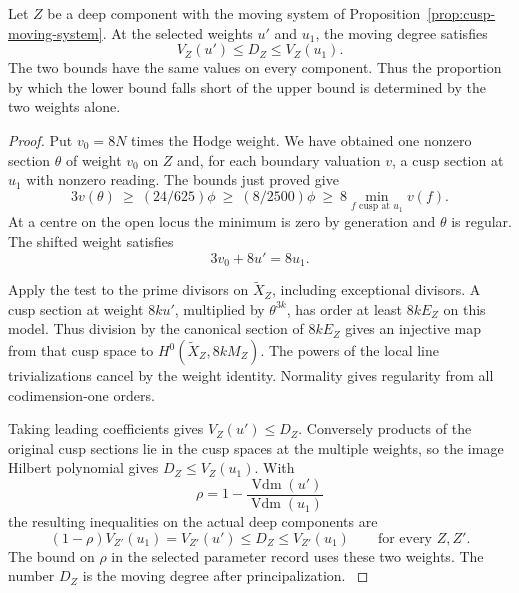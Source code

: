 

\begin{proposition}\label{prop:deep-moving-degree}
Let \(Z\) be a deep component with the moving system of
Proposition~\ref{prop:cusp-moving-system}. At
the selected weights \(u'\) and \(u_1\), the moving degree
satisfies
\[
 V_Z(u')\le D_Z\le V_Z(u_1).
\]
The two bounds have the same values on every component. Thus the
proportion by which the lower bound falls short of the upper
bound is determined by the two weights alone.
\end{proposition}

\begin{proof}
Put \(v_0=8N\) times the Hodge weight. We have obtained one
nonzero section \(\theta\) of weight \(v_0\) on \(Z\) and,
for each boundary valuation \(v\), a cusp section at \(u_1\)
with nonzero reading. The bounds just proved give
\[
 3v(\theta)\ \ge\ (24/625)\phi
 \ \ge\ (8/2500)\phi
 \ \ge\ 8\min_{f\text{ cusp at }u_1} v(f).
\]
At a centre on the open locus the minimum is zero by
generation and \(\theta\) is regular. The shifted weight
satisfies
\[
 3v_0+8u'=8u_1.
\]

Apply the test to the prime divisors on \(\widetilde X_Z\),
including exceptional divisors. A cusp section at weight
\(8k u'\), multiplied by \(\theta^{3k}\), has order at
least \(8k E_Z\) on this model. Thus division by the
canonical section of \(8k E_Z\) gives an injective map
from that cusp space to \(H^0(\widetilde X_Z,8k M_Z)\).
The powers of the local line trivializations cancel by
the weight identity. Normality gives regularity from
all codimension-one orders.

Taking leading coefficients
gives \(V_Z(u')\le D_Z\). Conversely products of the
original cusp sections lie in the cusp spaces at the
multiple weights, so the image Hilbert polynomial gives
\(D_Z\le V_Z(u_1)\).
With
\[
 \rho=1-\frac{\operatorname{Vdm}(u')}{\operatorname{Vdm}(u_1)}
\]
the resulting inequalities on the actual deep components are
\begin{equation}
  (1-\rho)V_{Z'}(u_1)=V_{Z'}(u')\le D_Z\le V_{Z'}(u_1)
  \qquad\text{for every }Z,Z'.
  \label{eq:deep-component-degree}
\end{equation}
The bound on \(\rho\) in the selected parameter record
uses these two weights. The number \(D_Z\) is the moving
degree after principalization.
\label{cor:covolume-component-ranks-3}

\end{proof}

